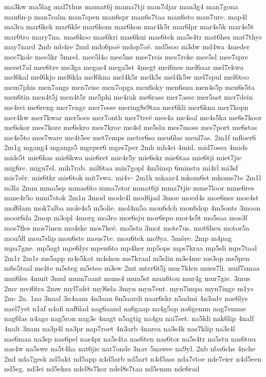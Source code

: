 ma3kw
ma5lag
mal7thus
mamat6j
mama7tji
man7djar
man3g4
man7gona
man6n-p
man7salm
man7spen
man6spr
man6s7taa
man6sto
man7ure.
map4l
ma3ra
mar6kek
mar6kle
mar6kom
mar6kon
mar4k5r
mar6lpr
mar4s5k
mar4s5t
mar6tro
mary7na.
mas6koo
mas6kri
mas6kui
mas6tek
ma5s4tr
mat6hes
mat7thys
may7nard
2mb
mb4re
2md
mdo6poë
mdop7oë.
md5soo
m3dw
md4wa
4meder
mee7kole
mee5kr
5meel.
mee5l4o
mee5ne
mee7reis
mee7reke
mee5sl
mee7spre
meest7al
mee6tre
me3ga
megas4
mega5st
4megt
mei6nee
mel6aar
mel7ekwa
mel6kal
mel6kjo
mel6kla
mel6kna
mel4k5r
melk5s
mel4k5w
mel7spul
mel6too
mem7phis
men7angs
men7eise
men7opga
men6sky
men6snu
men4s5p
men6s5ta
men6tin
men4t5j
men4t5r
me5phi
me4rak
me6rass
mer7asse
mer5ast
mer7dein
me4rei
me6reng
mer7enge
mer7esse
mering8s9taa
mer6kli
mer6kna
mer7kopn
mer4kw
mer7kwar
mer5oes
mer7onth
mer7treë
mes4a
me4sal
me4s5ka
me6s7koor
me6skor
mes7kore
me6skro
mes7kroe
me4sl
me5slu
mes7moss
mes7port
me6stas
me4s5to
mes7ware
me4t5ee
met7emps
meter6so
meu6las
meul7as.
2m1f
mfloer6
2m1g
mgang4
mgangs5
mgeper6
mges7per
2mh
mh4ei
4mid.
mid7osea
4mids
mids5t
mie6kas
mie6kwa
mie6ret
mie4r5y
mie6skr
mie6taa
mie6tji
miet7jie
mig6re.
migu7el.
mih7rab.
mil6taa
min7gopl
4m5insp
6minstu
mi4rl
mi3sf
mis7sêr.
mis6tkr
mis6tok
mit7swa.
mi4v-
2m1k
mkaar4
mkom6st
mkoms7te
2m1l
m3la
2mm
mma5sp
mmas6to
mma7stor
mmat6ji
mma7tjie
mme7loor
mme6res
mme4r5o
mmi7stok
2m1n
3mod
mode4l
mod6jad
3moe
moed4s
moe6nes
moe4st
mof6lam
mok7alba
mole4s5
m5olie.
mol4m5a
mon6dch
mon6dop
4m5onts
3moon
moor6da
2mop
m3opl
4morg
mo3ro
mor6sju
mor6spo
mor4s5t
mo5saa
mos3f
mos7fles
mos7inen
mo4ske
mos7keë.
mo5sta
3mot
mote7us.
mot6heu
motor5a
mou5fl
mou7slip
mou6ste
mous7te.
mou6tek
mo9ya.
5môre.
2mp
m4pag
mpa7gne.
mp5agt
mpe6lys
mpen6to
mp4her
mp5ops
mps7kraa
mp5sli
mps7taal
2m1r
2m1s
ms5app
m4s5kat
m4skon
ms7kraal
m5slin
m3s4me
ms3op
ms5pen
m6s5taal
ms4te
m5steg
m5steo
m3sw
2mt
mter6t5j
muc7klen
mues7li.
muf7smaa
mui6les
4muit
3mul
mum7aant
muns4
mun5st
mun6tou
mur4g
mur7gie.
3mus
2mv
mvi6tra
2mw
myl7afst
myl6sla
3myn
myn7ent.
myn7impa
myn7inge
m1ys
2m-
2n.
1na
3naal
3n4aam
4n3aan
6n5aardi
naar6skr
n5admi
4n3adv
nae6lys
nael7yst
n1af
n4afi
naf6lad
nag6aand
na6gaap
na4g5ap
na6gemm
nag7emme
nag6las
n4ago
nag5ron
nag3s
4nagt
n5agtig
na4gu
nai7set.
na5kli
nak6lip
4nalf
4nalt
3nam
na3p4l
na3pr
nap7roet
4n3arb
4narea
na3s4k
nas7klip
na3s4l
nas6maa
na3sp
nas6pel
nas4pr
na5s4ta
nas6ten
nas6tor
na5s4tr
na5stu
nas6tuu
nas4w
na5swe
na5t4ha
nat6jie
nat7onde
3nav
5nawee
na9yl.
2nb
nba6chs
4nche
2nd
nda7gesk
nd5akt
nd5app
n4d5arb
nd5art
n4d5ass
nda7stoe
nde7eier
n4d5een
nd5eg.
nd3ei
nd5eksa
ndel8s7kor
ndel8s7taa
nd5emm
nde6rad
